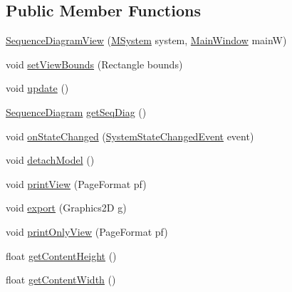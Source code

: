 \subsection*{Public Member Functions}
\begin{DoxyCompactItemize}
\item 
\hyperlink{classorg_1_1tzi_1_1use_1_1gui_1_1views_1_1diagrams_1_1behavior_1_1sequencediagram_1_1_sequence_diagram_view_ab3505b506505b0146d69549c9402bb6b}{Sequence\-Diagram\-View} (\hyperlink{classorg_1_1tzi_1_1use_1_1uml_1_1sys_1_1_m_system}{M\-System} system, \hyperlink{classorg_1_1tzi_1_1use_1_1gui_1_1main_1_1_main_window}{Main\-Window} main\-W)
\item 
void \hyperlink{classorg_1_1tzi_1_1use_1_1gui_1_1views_1_1diagrams_1_1behavior_1_1sequencediagram_1_1_sequence_diagram_view_a8e07c73baf62d5f03059f9066e120091}{set\-View\-Bounds} (Rectangle bounds)
\item 
void \hyperlink{classorg_1_1tzi_1_1use_1_1gui_1_1views_1_1diagrams_1_1behavior_1_1sequencediagram_1_1_sequence_diagram_view_a33e9668564972471536b63561dfaba37}{update} ()
\item 
\hyperlink{classorg_1_1tzi_1_1use_1_1gui_1_1views_1_1diagrams_1_1behavior_1_1sequencediagram_1_1_sequence_diagram}{Sequence\-Diagram} \hyperlink{classorg_1_1tzi_1_1use_1_1gui_1_1views_1_1diagrams_1_1behavior_1_1sequencediagram_1_1_sequence_diagram_view_a8f60f2900f8ad2b7068b57b8b66af8c3}{get\-Seq\-Diag} ()
\item 
void \hyperlink{classorg_1_1tzi_1_1use_1_1gui_1_1views_1_1diagrams_1_1behavior_1_1sequencediagram_1_1_sequence_diagram_view_acad04b5033bb1757cbb5ecc97c472209}{on\-State\-Changed} (\hyperlink{interfaceorg_1_1tzi_1_1use_1_1uml_1_1sys_1_1events_1_1tags_1_1_system_state_changed_event}{System\-State\-Changed\-Event} event)
\item 
void \hyperlink{classorg_1_1tzi_1_1use_1_1gui_1_1views_1_1diagrams_1_1behavior_1_1sequencediagram_1_1_sequence_diagram_view_a01d0c19b9a2632ce7abaf8cafe68a1f8}{detach\-Model} ()
\item 
void \hyperlink{classorg_1_1tzi_1_1use_1_1gui_1_1views_1_1diagrams_1_1behavior_1_1sequencediagram_1_1_sequence_diagram_view_ac0117e39ff174173f4a14f4d7c867c5c}{print\-View} (Page\-Format pf)
\item 
void \hyperlink{classorg_1_1tzi_1_1use_1_1gui_1_1views_1_1diagrams_1_1behavior_1_1sequencediagram_1_1_sequence_diagram_view_a19e9b50c9b5138749934545a12c55543}{export} (Graphics2\-D g)
\item 
void \hyperlink{classorg_1_1tzi_1_1use_1_1gui_1_1views_1_1diagrams_1_1behavior_1_1sequencediagram_1_1_sequence_diagram_view_ab6a0a0631131f768e1171b206dadd4e5}{print\-Only\-View} (Page\-Format pf)
\item 
float \hyperlink{classorg_1_1tzi_1_1use_1_1gui_1_1views_1_1diagrams_1_1behavior_1_1sequencediagram_1_1_sequence_diagram_view_a9154af4345da45973d0b7f7d0dea441f}{get\-Content\-Height} ()
\item 
float \hyperlink{classorg_1_1tzi_1_1use_1_1gui_1_1views_1_1diagrams_1_1behavior_1_1sequencediagram_1_1_sequence_diagram_view_a5ccd31a6ee53ee8f99d14779341030b0}{get\-Content\-Width} ()
\end{DoxyCompactItemize}


